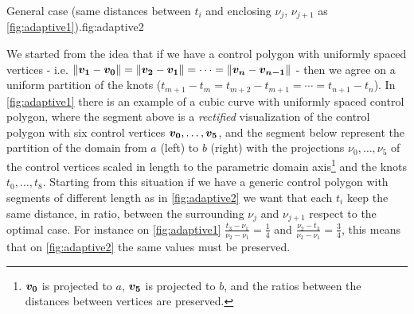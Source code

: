 \documentclass[dissertation.tex]{subfiles}
\begin{document}
\begin{myfig}{General case (same distances between
    $t_i$ and enclosing $\nu_j$, $\nu_{j+1}$ as \cref{fig:adaptive1}).}{fig:adaptive2}
\end{myfig}
We started from the idea that if we have a control polygon with
uniformly spaced vertices -
i.e. $\left\lVert\boldsymbol{v_1}-\boldsymbol{v_0}\right\rVert=\left\lVert\boldsymbol{v_2}-\boldsymbol{v_1}\right\rVert=\cdots=\left\lVert\boldsymbol{v_n}-\boldsymbol{v_{n-1}}\right\rVert$
- then we agree on a uniform partition of the knots
($t_{m+1}-t_m=t_{m+2}-t_{m+1}=\cdots=t_{n+1}-t_n$). In
\cref{fig:adaptive1} there is an example of a cubic \bs curve with
uniformly spaced control polygon, where the segment above is a
\emph{rectified} 
visualization of the control polygon with six control
vertices
$\boldsymbol{v_0},\dots,\boldsymbol{v_5}$, and the segment below represent the
partition of the domain from $a$ (left) to $b$
(right) with the projections $\nu_0,\dots,\nu_5$ of the control vertices
scaled in length to the parametric domain axis\footnote{$\boldsymbol{v_0}$ is
  projected to $a$, $\boldsymbol{v_5}$ is projected to $b$, and the ratios
  between the distances between vertices are preserved.} and the knots $t_0,\dots,t_8$. Starting from this situation if
we have a generic control polygon with segments of different length as
in \cref{fig:adaptive2} we want that each $t_i$ keep the same
distance, in ratio, between the surrounding $\nu_j$ and $\nu_{j+1}$
respect to the optimal case. For instance on \cref{fig:adaptive1}
$\frac{t_3-\nu_1}{\nu_2-\nu_1}=\frac{1}{4}$ and
$\frac{\nu_2-t_3}{\nu_2-\nu_1}=\frac{3}{4}$, this means that on
\cref{fig:adaptive2} the same values must be preserved.
\end{document}
